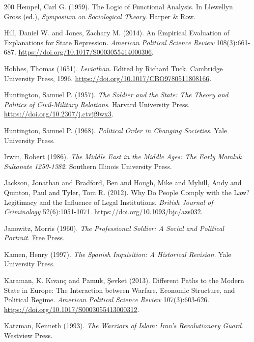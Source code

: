 \documentclass[11pt,letterpaper]{article}
\theoremstyle{definition}
\theoremstyle{remark}
\begin{document}
\begin{thebibliography}{200}
Hempel, Carl G. (1959). The Logic of Functional Analysis. In Llewellyn Gross (ed.), \emph{Symposium on Sociological Theory}. Harper \& Row.

Hill, Daniel W. and Jones, Zachary M. (2014). An Empirical Evaluation of Explanations for State Repression. \emph{American Political Science Review} 108(3):661-687. \url{https://doi.org/10.1017/S0003055414000306}.

Hobbes, Thomas (1651). \emph{Leviathan}. Edited by Richard Tuck. Cambridge University Press, 1996. \url{https://doi.org/10.1017/CBO9780511808166}.

Huntington, Samuel P. (1957). \emph{The Soldier and the State: The Theory and Politics of Civil-Military Relations}. Harvard University Press. \url{https://doi.org/10.2307/j.ctvjf9wx3}.

Huntington, Samuel P. (1968). \emph{Political Order in Changing Societies}. Yale University Press.

Irwin, Robert (1986). \emph{The Middle East in the Middle Ages: The Early Mamluk Sultanate 1250-1382}. Southern Illinois University Press.

Jackson, Jonathan and Bradford, Ben and Hough, Mike and Myhill, Andy and Quinton, Paul and Tyler, Tom R. (2012). Why Do People Comply with the Law? Legitimacy and the Influence of Legal Institutions. \emph{British Journal of Criminology} 52(6):1051-1071. \url{https://doi.org/10.1093/bjc/azs032}.

Janowitz, Morris (1960). \emph{The Professional Soldier: A Social and Political Portrait}. Free Press.

Kamen, Henry (1997). \emph{The Spanish Inquisition: A Historical Revision}. Yale University Press.

Karaman, K. K{\i}van\c{c} and Pamuk, \c{S}evket (2013). Different Paths to the Modern State in Europe: The Interaction between Warfare, Economic Structure, and Political Regime. \emph{American Political Science Review} 107(3):603-626. \url{https://doi.org/10.1017/S0003055413000312}.

Katzman, Kenneth (1993). \emph{The Warriors of Islam: Iran's Revolutionary Guard}. Westview Press.


\end{thebibliography}
\end{document}
